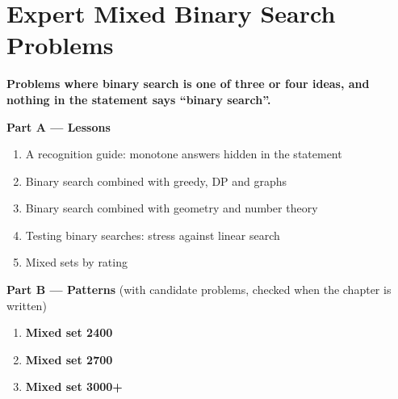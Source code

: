 \chapter{Expert Mixed Binary Search Problems}
\label{ch:expert_mixed}

\begin{tcolorbox}[enhanced, colback=white, colframe=secondaryblue, boxrule=1pt, arc=2mm]
\textbf{\large\textcolor{primaryblue}{Problems where binary search is one of three or four ideas, and nothing in the statement says ``binary search''.}}
\end{tcolorbox}


\begin{plannedbox}
\textbf{Part A --- Lessons}
\begin{enumerate}[leftmargin=*, label=\textbf{A\arabic*.}, itemsep=1pt]
    \item A recognition guide: monotone answers hidden in the statement
    \item Binary search combined with greedy, DP and graphs
    \item Binary search combined with geometry and number theory
    \item Testing binary searches: stress against linear search
    \item Mixed sets by rating
\end{enumerate}
\textbf{Part B --- Patterns} (with candidate problems, checked when the chapter is written)
\begin{enumerate}[leftmargin=*, label=\textbf{P\arabic*.}, itemsep=1pt]
    \item \textbf{Mixed set 2400}
    \item \textbf{Mixed set 2700}
    \item \textbf{Mixed set 3000+}
\end{enumerate}
\end{plannedbox}

